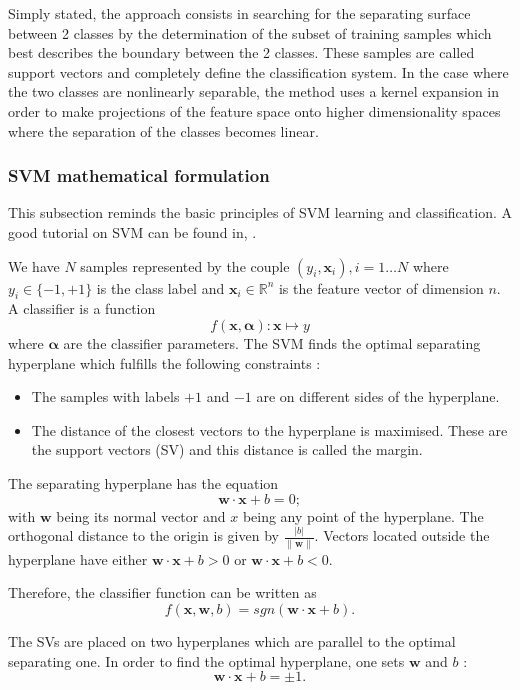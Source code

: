 Simply stated, the approach consists in searching for the separating
surface between 2 classes by the determination of the subset of
training samples which best describes the boundary between the 2
classes. These samples are called support vectors and completely
define the classification system. In the case where the two classes are
nonlinearly separable, the method uses a kernel expansion in order to make
projections of the feature space onto higher dimensionality spaces
where the separation of the classes becomes linear.


\subsubsection{SVM mathematical formulation}

This subsection reminds the basic principles of SVM learning and
classification. A good tutorial on SVM can be found in, \cite{burges}.
 
We have $N$ samples represented by the couple $(y_i,\mathbf{x}_i),
i=1\ldots N$ where $y_i \in \{-1,+1\}$ is the class label and
$\mathbf{x}_i \in \mathbb{R}^n$ is the feature vector of dimension
$n$. A classifier is a function  $$f(\mathbf{x},\boldsymbol{\alpha}) :
\mathbf{x}\mapsto y$$ where $\boldsymbol{\alpha}$ are the classifier
parameters. The SVM finds the optimal separating hyperplane which
fulfills the following constraints :
    \begin{itemize}
      \item The samples with labels $+1$ and $-1$ are on different
      sides of the hyperplane.
      \item The distance of the closest vectors to the hyperplane is
      maximised. These are the support vectors (SV) and this distance is
      called the margin.
    \end{itemize}

    The separating hyperplane has the equation
    $$\mathbf{w}\cdot\mathbf{x}+b=0;$$ with $\mathbf{w}$ being its
    normal vector and $x$ being any point of the hyperplane. The
    orthogonal distance to the origin is given by
    $\frac{|b|}{\|\mathbf{w}\|}$. Vectors located outside the
    hyperplane have either $\mathbf{w}\cdot\mathbf{x}+b>0$ or
      $\mathbf{w}\cdot\mathbf{x}+b<0$.

    Therefore, the classifier function can be written as
    $$f(\mathbf{x},\mathbf{w}, b)=sgn(\mathbf{w}\cdot\mathbf{x}+b).$$
    
The SVs are placed on two hyperplanes which are parallel to the
      optimal separating one. In order to find the optimal
      hyperplane, one sets $\mathbf{w}$ and
      $b$ : $$\mathbf{w}\cdot\mathbf{x}+b=\pm 1.$$

